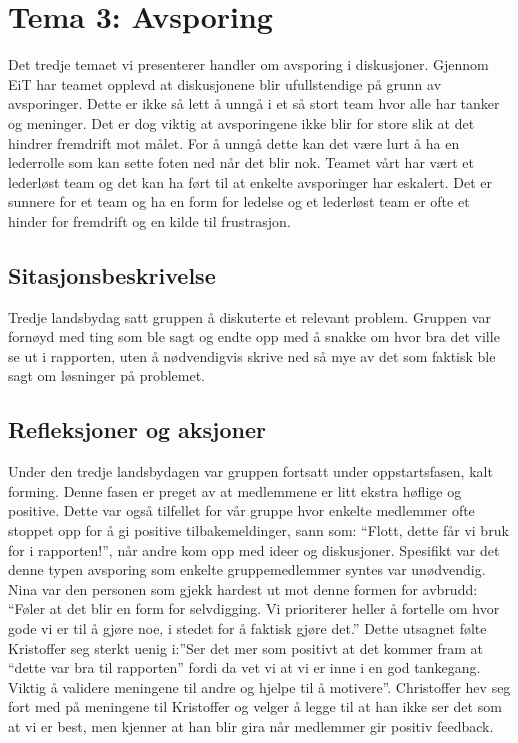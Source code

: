 \chapter{Tema 3: Avsporing}

Det tredje temaet vi presenterer handler om avsporing i diskusjoner. Gjennom EiT har teamet opplevd at diskusjonene
blir ufullstendige på grunn av avsporinger. Dette er ikke så lett å unngå i et så stort team hvor alle har tanker og meninger.
Det er dog viktig at avsporingene ikke blir for store slik at det hindrer fremdrift mot målet. For å unngå dette kan det være lurt
å ha en lederrolle som kan sette foten ned når det blir nok. Teamet vårt har vært et lederløst team og det kan ha ført til at 
enkelte avsporinger har eskalert. Det er sunnere for et team og ha en form for ledelse og et lederløst team er ofte et hinder for 
fremdrift og en kilde til frustrasjon.

\section{Sitasjonsbeskrivelse}

Tredje landsbydag satt gruppen å diskuterte et relevant problem. Gruppen var fornøyd med ting som ble sagt og endte opp med å 
snakke om hvor bra det ville se ut i rapporten, uten å nødvendigvis skrive ned så mye av det som faktisk ble sagt om løsninger på 
problemet.

\section{Refleksjoner og aksjoner}

Under den tredje landsbydagen var gruppen fortsatt under oppstartsfasen, kalt forming. Denne fasen er preget av at medlemmene er 
litt ekstra høflige og positive. Dette var også tilfellet for vår gruppe hvor enkelte medlemmer ofte stoppet opp for å gi positive 
tilbakemeldinger, sann som: “Flott, dette får vi bruk for i rapporten!”, når andre kom opp med ideer og diskusjoner. Spesifikt var det 
denne typen avsporing som enkelte gruppemedlemmer syntes var unødvendig. Nina var den personen som gjekk hardest ut mot 
denne formen for avbrudd: “Føler at det blir en form for selvdigging. Vi prioriterer heller å fortelle om hvor gode vi er til å gjøre noe, i 
stedet for å faktisk gjøre det.” Dette utsagnet følte Kristoffer seg sterkt uenig i:”Ser det mer som positivt at det kommer fram at “dette 
var bra til rapporten” fordi da vet vi at vi er inne i en god tankegang. Viktig å validere meningene til andre og hjelpe til å motivere”. 
Christoffer hev seg fort med på meningene til Kristoffer og velger å legge til at han ikke ser det som at vi er best, men kjenner at han 
blir gira når medlemmer gir positiv feedback. 

